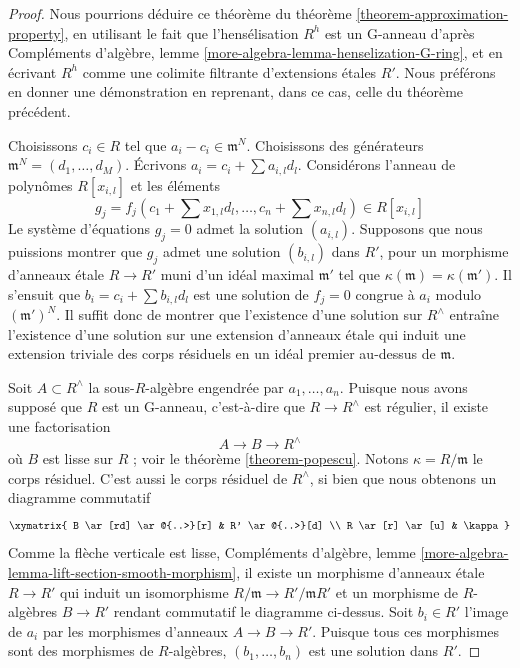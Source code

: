 \begin{proof}
Nous pourrions déduire ce théorème du théorème
\ref{theorem-approximation-property}, en utilisant le fait que
l'hensélisation $R^h$ est un G-anneau d'après
Compléments d'algèbre, lemme
\ref{more-algebra-lemma-henselization-G-ring}, et en écrivant $R^h$ comme une
colimite filtrante d'extensions \'etales $R'$. Nous préférons en donner une
démonstration en reprenant, dans ce cas, celle du théorème précédent.

\medskip\noindent
Choisissons $c_i \in R$ tel que $a_i - c_i \in \mathfrak m^N$.
Choisissons des générateurs $\mathfrak m^N = (d_1, \ldots, d_M)$.
Écrivons $a_i = c_i + \sum a_{i, l} d_l$.
Considérons l'anneau de polynômes $R[x_{i, l}]$ et les éléments
$$
g_j = f_j(c_1 + \sum x_{1, l} d_l , \ldots, c_n + \sum x_{n, l} d_l)
\in R[x_{i, l}]
$$
Le système d'équations $g_j = 0$ admet la solution $(a_{i, l})$.
Supposons que nous puissions montrer que $g_j$ admet une solution
$(b_{i, l})$ dans $R'$, pour un morphisme d'anneaux \'etale $R \to R'$ muni
d'un idéal maximal $\mathfrak m'$ tel que
$\kappa(\mathfrak m) = \kappa(\mathfrak m')$.
Il s'ensuit que $b_i = c_i + \sum b_{i, l}d_l$ est une solution
de $f_j = 0$ congrue à $a_i$ modulo $(\mathfrak m')^N$.
Il suffit donc de montrer que l'existence d'une solution sur $R^\wedge$
entraîne l'existence d'une solution sur une extension d'anneaux \'etale
qui induit une extension triviale des corps résiduels en un idéal premier
au-dessus de $\mathfrak m$.

\medskip\noindent
Soit $A \subset R^\wedge$ la sous-$R$-algèbre engendrée par
$a_1, \ldots, a_n$. Puisque nous avons supposé que $R$ est un G-anneau,
c'est-à-dire que $R \to R^\wedge$ est régulier, il existe une factorisation
$$
A \to B \to R^\wedge
$$
où $B$ est lisse sur $R$ ; voir le théorème \ref{theorem-popescu}.
Notons $\kappa = R/\mathfrak m$ le corps résiduel. C'est aussi
le corps résiduel de $R^\wedge$, si bien que nous obtenons un diagramme
commutatif
$$
\xymatrix{
B \ar[rd] \ar@{..>}[r] & R' \ar@{..>}[d] \\
R \ar[r] \ar[u] & \kappa
}
$$
Comme la flèche verticale est lisse,
Compléments d'algèbre, lemme
\ref{more-algebra-lemma-lift-section-smooth-morphism},
il existe un morphisme d'anneaux \'etale $R \to R'$ qui induit un isomorphisme
$R/\mathfrak m \to R'/\mathfrak mR'$ et un morphisme de $R$-algèbres
$B \to R'$ rendant commutatif le diagramme ci-dessus.
Soit $b_i \in R'$ l'image de $a_i$ par les morphismes d'anneaux
$A \to B \to R'$. Puisque tous ces morphismes sont des morphismes de
$R$-algèbres, $(b_1, \ldots, b_n)$ est une solution dans $R'$.
\end{proof}

